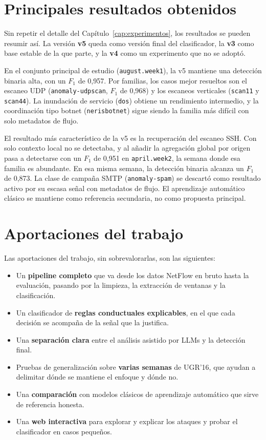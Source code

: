 \section{Principales resultados obtenidos}
\label{sec:concl_resultados}

Sin repetir el detalle del Capítulo~\ref{cap:experimentos}, los resultados se pueden resumir así. La versión \textbf{v5} queda como versión final del clasificador, la \textbf{v3} como base estable de la que parte, y la \textbf{v4} como un experimento que no se adoptó.

En el conjunto principal de estudio (\texttt{august.week1}), la v5 mantiene una detección binaria alta, con un $F_1$ de 0,957. Por familias, los casos mejor resueltos son el escaneo UDP (\texttt{anomaly-udpscan}, $F_1$ de 0,968) y los escaneos verticales (\texttt{scan11} y \texttt{scan44}). La inundación de servicio (\texttt{dos}) obtiene un rendimiento intermedio, y la coordinación tipo botnet (\texttt{nerisbotnet}) sigue siendo la familia más difícil con solo metadatos de flujo.

El resultado más característico de la v5 es la recuperación del escaneo SSH. Con solo contexto local no se detectaba, y al añadir la agregación global por origen pasa a detectarse con un $F_1$ de 0,951 en \texttt{april.week2}, la semana donde esa familia es abundante. En esa misma semana, la detección binaria alcanza un $F_1$ de 0,873. La clase de campaña SMTP (\texttt{anomaly-spam}) se descartó como resultado activo por su escasa señal con metadatos de flujo. El aprendizaje automático clásico se mantiene como referencia secundaria, no como propuesta principal.

\section{Aportaciones del trabajo}
\label{sec:concl_aportaciones}

Las aportaciones del trabajo, sin sobrevalorarlas, son las siguientes:

\begin{itemize}
  \item Un \textbf{pipeline completo} que va desde los datos NetFlow en bruto hasta la evaluación, pasando por la limpieza, la extracción de ventanas y la clasificación.
  \item Un clasificador de \textbf{reglas conductuales explicables}, en el que cada decisión se acompaña de la señal que la justifica.
  \item Una \textbf{separación clara} entre el análisis asistido por LLMs y la detección final.
  \item Pruebas de generalización sobre \textbf{varias semanas} de UGR'16, que ayudan a delimitar dónde se mantiene el enfoque y dónde no.
  \item Una \textbf{comparación} con modelos clásicos de aprendizaje automático que sirve de referencia honesta.
  \item Una \textbf{web interactiva} para explorar y explicar los ataques y probar el clasificador en casos pequeños.
\end{itemize}

